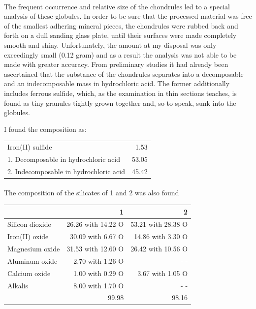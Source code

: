 \documentclass[a4paper, 12pt, oneside]{article}
\begin{document}
\paragraph*{}
The frequent occurrence and relative size of the chondrules led to a special analysis of these globules. In order to be sure that the processed material was free of the smallest adhering mineral pieces, the chondrules were rubbed back and forth on a dull sanding glass plate, until their surfaces were made completely smooth and shiny. Unfortunately, the amount at my disposal was only exceedingly small (0.12 gram) and as a result the analysis was not able to be made with greater accuracy. From preliminary studies it had already been ascertained that the substance of the chondrules separates into a decomposable and an indecomposable mass in hydrochloric acid. The former additionally includes ferrous sulfide, which, as the examination in thin sections teaches, is found as tiny granules tightly grown together and, so to speak, sunk into the globules.

I found the composition as:
\begin{center}
    \begin{tabular}{l r}
        Iron(II) sulfide & 1.53\\
        1. Decomposable in hydrochloric acid & 53.05\\
        2. Indecomposable in hydrochloric acid & 45.42\\
    \end{tabular}
\end{center}
\paragraph*{}
The composition of the silicates of 1 and 2 was also found  
\begin{center}
    \begin{tabular}{|l|r|r|}
        \hline
        & 1 & 2\\\hline
        Silicon dioxide & 26.26 with 14.22 O & 53.21 with 28.38 O\\\hline
        Iron(II) oxide & 30.09 with 6.67 O & 14.86 with 3.30 O\\\hline
        Magnesium oxide & 31.53 with 12.60 O & 26.42 with 10.56 O\\\hline
        Aluminum oxide & 2.70 with 1.26 O & - -\\\hline
        Calcium oxide & 1.00 with 0.29 O & 3.67 with 1.05 O\\\hline
        Alkalis & 8.00 with 1.70 O & - -\\\hline
        & 99.98 & 98.16\\
        \hline
    \end{tabular}
\end{center}
\end{document}
